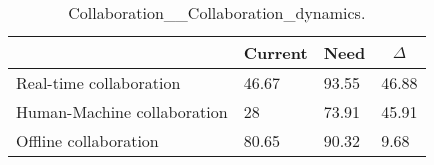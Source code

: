 
  \begin{table*}[]
  \centering
  \notsotiny
  \caption{ Collaboration__Collaboration_dynamics.}
\label{tab:collaboration__collaboration_dynamics}
\begin{tabular}{|l|l|l|l|}
  \hline
  \rowcolor[HTML]{C0C0C0}
    \multicolumn{1}{|c|}{Feature} & \multicolumn{1}{c|}{Current} & \multicolumn{1}{c|}{Need} & \multicolumn{1}{c|}{$\Delta$} \\ \hline
  Real-time collaboration & 46.67 & 93.55 & 46.88 \\ \hline 
Human-Machine collaboration & 28 & 73.91 & 45.91 \\ \hline 
Offline collaboration & 80.65 & 90.32 & 9.68 \\ \hline 
\end{tabular}%
  \end{table*}